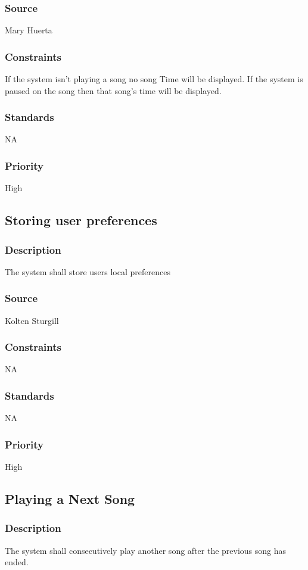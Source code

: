 \subsubsection{Source}
Mary Huerta
\subsubsection{Constraints}
If the system isn't playing a song no song Time will be displayed. If the system is paused on the song then that song's time will be displayed. 
\subsubsection{Standards}
NA
\subsubsection{Priority}
High



\subsection{Storing user preferences}
\subsubsection{Description}
The system shall store users local preferences
\subsubsection{Source}
Kolten Sturgill
\subsubsection{Constraints}
NA
\subsubsection{Standards}
NA
\subsubsection{Priority}
High



\subsection{Playing a Next Song}
\subsubsection{Description}
The system shall consecutively play another song after the previous song has ended.
